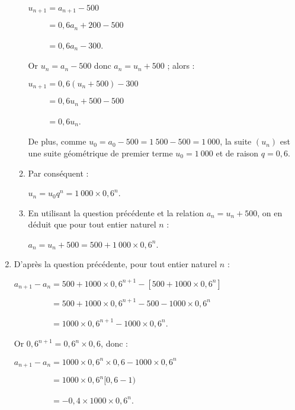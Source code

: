 \begin{corrige}
\begin{enumerate}
\begin{enumerate}[label=\alph*.]
               $u_{n+1}=a_{n+1}-500$
               \par
               $\phantom{u_{n+1}}=0,6a_n+200-500$
               \par
               $\phantom{u_{n+1}}=0,6a_n-300$.
               \par
               Or $u_n=a_n-500$ donc $a_n=u_n+500$ ; alors :
               \par
               $u_{n+1}=0,6(u_n+500)-300$
               \par
               $\phantom{u_{n+1}}=0,6u_n+500-500$
               \par
               $\phantom{u_{n+1}}=0,6u_n$.
               \par
               De plus, comme ${u_0=a_0-500=1~500-500=1~000}$, la suite $(u_n)$ est une suite géométrique de premier terme ${u_0=1~000}$ et de raison ${q=0,6}$.
               \item %
               Par conséquent :
               \par
               $u_n=u_0q^n=1~000 \times 0,6^n$.
               \item %
               En utilisant la question précédente et la relation ${a_n=u_n+500}$, on en déduit que pour tout entier naturel $n$ :
               \par
               $a_n=u_n+500=500+1~000 \times 0,6^n$.
               \par
          \end{enumerate}
          \item %
          D'après la question précédente, pour tout entier naturel $n$ :
          \par
          $a_{n+1}-a_n=500+1000 \times 0,6^{n+1}-\left[500+1000 \times 0,6^n\right]$
          \par
          $\phantom{a_{n+1}-a_n}=500+1000 \times 0,6^{n+1}-500-1000 \times 0,6^n$
          \par
          $\phantom{a_{n+1}-a_n}=1000 \times 0,6^{n+1}-1000 \times 0,6^n$.
          \par
          \vspace{2mm}
          Or $0,6^{n+1}=0,6^n \times 0,6$, donc :
          \par
          $a_{n+1}-a_n=1000 \times 0,6^n \times 0,6-1000 \times 0,6^n$
          \par
          $\phantom{a_{n+1}-a_n}=1000 \times 0,6^{n}[0,6-1)$
          \par
          $\phantom{a_{n+1}-a_n}=-0,4 \times 1000 \times 0,6^{n}$.

\end{enumerate}
\end{corrige}
